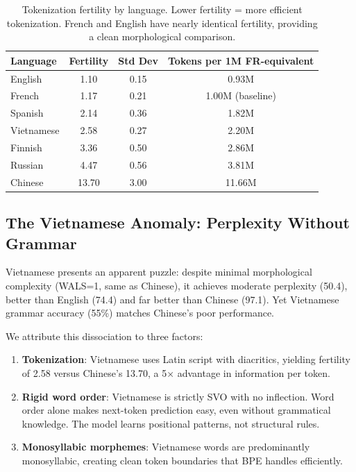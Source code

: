 \documentclass[11pt]{article}
\begin{document}
\begin{table}[ht]
\centering
\begin{tabular}{lccc}
\toprule
Language & Fertility & Std Dev & Tokens per 1M FR-equivalent \\
\midrule
English & 1.10 & 0.15 & 0.93M \\
French & 1.17 & 0.21 & 1.00M (baseline) \\
Spanish & 2.14 & 0.36 & 1.82M \\
Vietnamese & 2.58 & 0.27 & 2.20M \\
Finnish & 3.36 & 0.50 & 2.86M \\
Russian & 4.47 & 0.56 & 3.81M \\
Chinese & 13.70 & 3.00 & 11.66M \\
\bottomrule
\end{tabular}
\caption{Tokenization fertility by language. Lower fertility = more efficient tokenization. French and English have nearly identical fertility, providing a clean morphological comparison.}
\label{tab:fertility-en}
\end{table}

\subsection{The Vietnamese Anomaly: Perplexity Without Grammar}

Vietnamese presents an apparent puzzle: despite minimal morphological complexity (WALS=1, same as Chinese), it achieves moderate perplexity (50.4), better than English (74.4) and far better than Chinese (97.1). Yet Vietnamese grammar accuracy (55\%) matches Chinese's poor performance.

We attribute this dissociation to three factors:

\begin{enumerate}
    \item \textbf{Tokenization}: Vietnamese uses Latin script with diacritics, yielding fertility of 2.58 versus Chinese's 13.70, a 5× advantage in information per token.

    \item \textbf{Rigid word order}: Vietnamese is strictly SVO with no inflection. Word order alone makes next-token prediction easy, even without grammatical knowledge. The model learns positional patterns, not structural rules.

    \item \textbf{Monosyllabic morphemes}: Vietnamese words are predominantly monosyllabic, creating clean token boundaries that BPE handles efficiently.
\end{enumerate}
\end{document}
